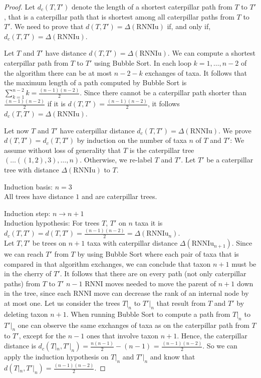 \documentclass[11pt, a4paper]{article}
\newcommand{\rnni}{\mathrm{RNNI}}
\newcommand{\rnniu}{\mathrm{RNNIu}}
\begin{document}
\begin{proof}
    Let $d_c(T,T')$ denote the length of a shortest caterpillar path from $T$ to $T'$, that is a caterpillar path that is shortest among all caterpillar paths from $T$ to $T'$.
    We need to prove that $d(T,T') = \Delta(\rnniu)$ if, and only if, $d_c(T,T') = \Delta(\rnniu)$.

    Let $T$ and $T'$ have distance $d(T,T') = \Delta(\rnniu)$.
    We can compute a  shortest caterpillar path from $T$ to $T'$ using Bubble Sort.
    In each loop $k=1, \ldots, n-2$ of the algorithm there can be at most $n-2-k$ exchanges of taxa.
    It follows that the maximum length of a path computed by Bubble Sort is $\sum\limits_{k=1}^{n-2} k = \frac{(n-1)(n-2)}{2}$.
    Since there cannot be a caterpillar path shorter than $\frac{(n-1)(n-2)}{2}$ if it is $d(T,T') = \frac{(n-1)(n-2)}{2}$, it follows $d_c(T,T') = \Delta(\rnniu)$.

    Let now $T$ and $T'$ have caterpillar distance $d_c(T,T') = \Delta(\rnniu)$.
    We prove $d(T,T') = d_c(T,T')$ by induction on the number of taxa $n$ of $T$ and $T'$:
    We assume without loss of generality that $T$ is the caterpillar tree $(\ldots ((1,2),3), \ldots, n)$.
    Otherwise, we re-label $T$ and $T'$.
    Let $T'$ be a caterpillar tree with distance $\Delta(\rnniu)$ to $T$.

    Induction basis: $n=3$\\
    All trees have distance $1$ and are caterpillar trees.

    Induction step: $n \to n+1$\\
    Induction hypothesis: For trees $T$, $T'$ on $n$ taxa it is $d_c(T,T') = d(T, T') = \frac{(n-1)(n-2)}{2} = \Delta(\rnniu_n)$.\\
    Let $T, T'$ be trees on $n+1$ taxa with caterpillar distance $\Delta(\rnniu_{n+1})$.
    Since we can reach $T'$ from $T$ by using Bubble Sort where each pair of taxa that is compared in that algorithm exchanges, we can conclude that taxon $n+1$ must be in the cherry of $T'$.
    It follows that there are on every path (not only caterpillar paths) from $T$ to $T'$ $n-1$ $\rnni$ moves needed to move the parent of $n+1$ down in the tree, since each $\rnni$ move can decrease the rank of an internal node by at most one.
    Let us consider the trees $T|_n$ to $T'|_n$ that result from $T$ and $T'$ by deleting taxon $n+1$.
    When running Bubble Sort to compute a path from $T|_n$ to $T'|_n$ one can observe the same exchanges of taxa as on the caterpillar path from $T$ to $T'$, except for the $n-1$ ones that involve taxon $n+1$.
    Hence, the caterpillar distance is $d_c(T|_n, T'|_n) = \frac{n(n-1)}{2} - (n-1)$ = $\frac{(n-1)(n-2)}{2}$.
    So we can apply the induction hypothesis on $T|_n$ and $T'|_n$ and know that $d(T|_n,T'|_n) = \frac{(n-1)(n-2)}{2}$.


\end{proof}
\end{document}
